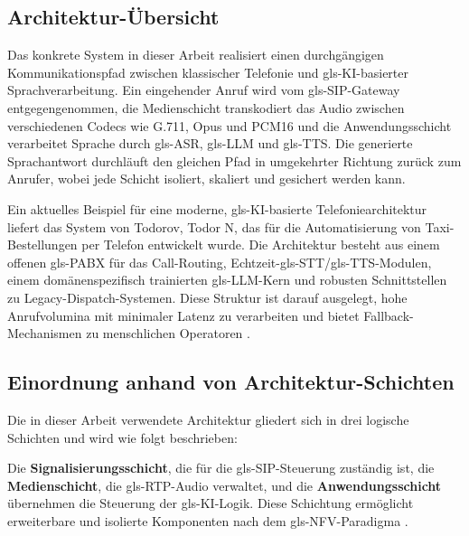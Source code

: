\subsection{Architektur-Übersicht}

Das konkrete System in dieser Arbeit realisiert einen durchgängigen Kommunikationspfad zwischen klassischer Telefonie und \gls{gls-KI}-basierter Sprachverarbeitung. Ein eingehender Anruf wird vom \gls{gls-SIP}-Gateway entgegengenommen, die Medienschicht transkodiert das Audio zwischen verschiedenen Codecs wie G.711, Opus und PCM16 und die Anwendungsschicht verarbeitet Sprache durch \gls{gls-ASR}, \gls{gls-LLM} und \gls{gls-TTS}. Die generierte Sprachantwort durchläuft den gleichen Pfad in umgekehrter Richtung zurück zum Anrufer, wobei jede Schicht isoliert, skaliert und gesichert werden kann.

Ein aktuelles Beispiel für eine moderne, \gls{gls-KI}-basierte Telefoniearchitektur liefert das System von Todorov, Todor N, das für die Automatisierung von Taxi-Bestellungen per Telefon entwickelt wurde. Die Architektur besteht aus einem offenen \gls{gls-PABX} für das Call-Routing, Echtzeit-\gls{gls-STT}/\gls{gls-TTS}-Modulen, einem domänenspezifisch trainierten \gls{gls-LLM}-Kern und robusten Schnittstellen zu Legacy-Dispatch-Systemen. Diese Struktur ist darauf ausgelegt, hohe Anrufvolumina mit minimaler Latenz zu verarbeiten und bietet Fallback-Mechanismen zu menschlichen Operatoren \parencite{Todorov2025LLMDispatcher}.

\subsection{Einordnung anhand von Architektur-Schichten}

Die in dieser Arbeit verwendete Architektur gliedert sich in drei logische Schichten und wird wie folgt beschrieben:

Die \textbf{Signalisierungsschicht}, die für die \gls{gls-SIP}-Steuerung zuständig ist, die \textbf{Medienschicht}, die \gls{gls-RTP}-Audio verwaltet, und die \textbf{Anwendungsschicht} übernehmen die Steuerung der \gls{gls-KI}-Logik. Diese Schichtung ermöglicht erweiterbare und isolierte Komponenten nach dem \gls{gls-NFV}-Paradigma \parencite{ETSI-NFV}.

